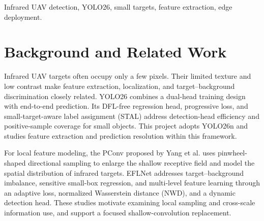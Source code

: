 \begin{abstract}
This project studies infrared UAV detection in cluttered scenes, where targets occupy few pixels, exhibit low contrast, and resemble background distractors. Using YOLO26n as the detection framework, it investigates how shallow feature extraction and high-resolution prediction affect small-target detection. SIRST-UAVB serves as the main dataset, with additional infrared small-target datasets supporting complementary experiments. The study compares a pinwheel-shaped convolution (PConv) and a P2 prediction branch through controlled experiments, false-alarm analysis, and end-to-end latency measurements. Video inference on a Raspberry Pi with H10 acceleration connects model evaluation with edge deployment. Deliverables include a data-processing pipeline, detector implementations, experimental analysis, and course presentation materials.
\end{abstract}

\begin{IEEEkeywords}
Infrared UAV detection, YOLO26, small targets, feature extraction, edge deployment.
\end{IEEEkeywords}

\section{Background and Related Work}
Infrared UAV targets often occupy only a few pixels. Their limited texture and low contrast make feature extraction, localization, and target--background discrimination closely related. YOLO26 combines a dual-head training design with end-to-end prediction. Its DFL-free regression head, progressive loss, and small-target-aware label assignment (STAL) address detection-head efficiency and positive-sample coverage for small objects. This project adopts YOLO26n and studies feature extraction and prediction resolution within this framework\cite{jocher2026yolo26,ultralytics2026docs}.

For local feature modeling, the PConv proposed by Yang et al. uses pinwheel-shaped directional sampling to enlarge the shallow receptive field and model the spatial distribution of infrared targets\cite{yang2025pconv}. EFLNet addresses target--background imbalance, sensitive small-box regression, and multi-level feature learning through an adaptive loss, normalized Wasserstein distance (NWD), and a dynamic detection head\cite{yang2024eflnet}. These studies motivate examining local sampling and cross-scale information use, and support a focused shallow-convolution replacement.

